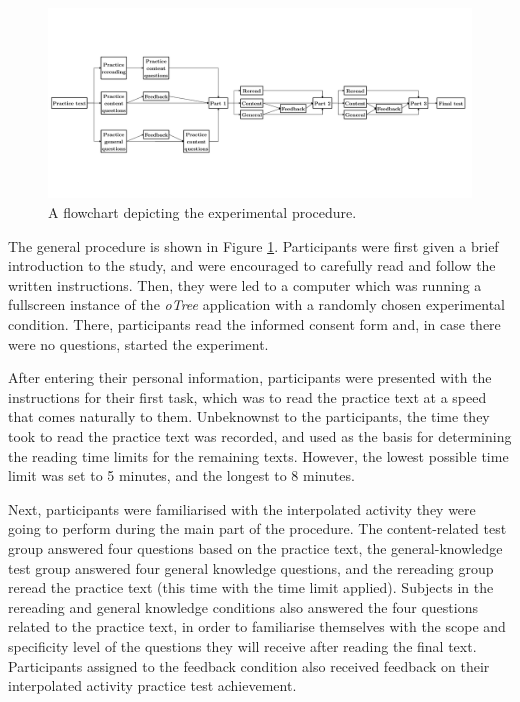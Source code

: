 \documentclass[11pt,]{article}
\begin{document}
\begin{figure}[p]
  \centering
  \includegraphics[width = 1.3\textwidth, keepaspectratio, angle = 90, trim = 0 0 0 0]{../images/flowchart/procedure.pdf}
  \caption{A flowchart depicting the experimental procedure.}
  \label{flowchart}
\end{figure}

The general procedure is shown in Figure \ref{flowchart}. Participants
were first given a brief introduction to the study, and were encouraged
to carefully read and follow the written instructions. Then, they were
led to a computer which was running a fullscreen instance of the
\textit{oTree} application with a randomly chosen experimental
condition. There, participants read the informed consent form and, in
case there were no questions, started the experiment.

After entering their personal information, participants were presented
with the instructions for their first task, which was to read the
practice text at a speed that comes naturally to them. Unbeknownst to
the participants, the time they took to read the practice text was
recorded, and used as the basis for determining the reading time limits
for the remaining texts. However, the lowest possible time limit was set
to 5 minutes, and the longest to 8 minutes.

Next, participants were familiarised with the interpolated activity they
were going to perform during the main part of the procedure. The
content-related test group answered four questions based on the practice
text, the general-knowledge test group answered four general knowledge
questions, and the rereading group reread the practice text (this time
with the time limit applied). Subjects in the rereading and general
knowledge conditions also answered the four questions related to the
practice text, in order to familiarise themselves with the scope and
specificity level of the questions they will receive after reading the
final text. Participants assigned to the feedback condition also
received feedback on their interpolated activity practice test
achievement.
\end{document}

